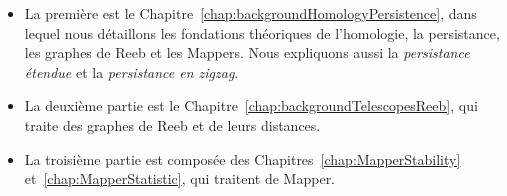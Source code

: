 \begin{itemize}
\item La premi\`ere est le Chapitre~\ref{chap:backgroundHomologyPersistence}, dans lequel nous d\'etaillons les fondations
th\'eoriques de l'homologie, la persistance, les graphes de Reeb et les Mappers. Nous expliquons aussi la {\em persistance \'etendue}
et la {\em persistance en zigzag}. 



\item La deuxi\`eme partie est le Chapitre~\ref{chap:backgroundTelescopesReeb}, qui traite des graphes de Reeb et de leurs distances.

\item La troisi\`eme partie est compos\'ee des Chapitres~\ref{chap:MapperStability} et~\ref{chap:MapperStatistic}, qui traitent de Mapper.




\end{itemize}

